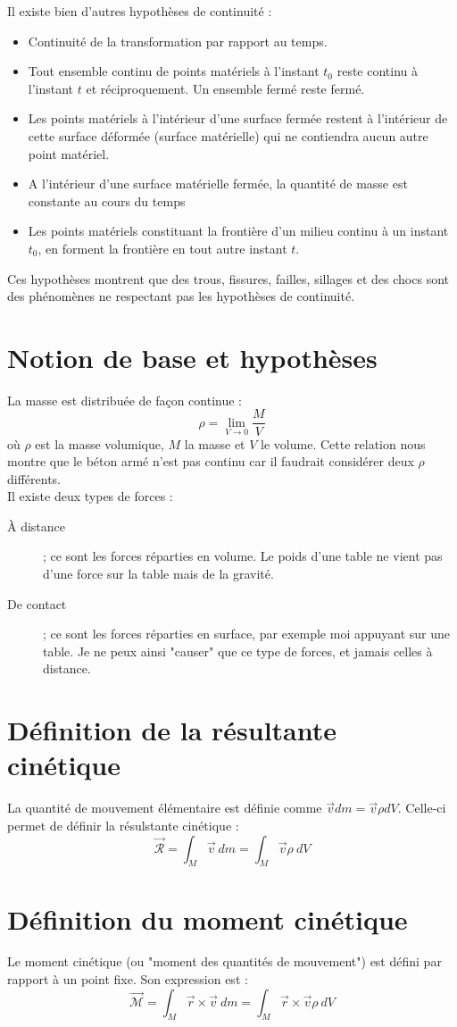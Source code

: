 Il existe bien d'autres hypothèses de continuité :
\begin{itemize}
	\item Continuité de la transformation par rapport au temps.
	\item Tout ensemble continu de points matériels à l'instant $t_0$ reste continu à l'instant $t$
	      et réciproquement. Un ensemble fermé reste fermé.
	\item Les points matériels à l'intérieur d'une surface fermée restent à l'intérieur de cette
	      surface déformée (surface matérielle) qui ne contiendra aucun autre point matériel.
	\item A l'intérieur d'une surface matérielle fermée, la quantité de masse est constante au cours
	      du temps
	\item Les points matériels constituant la frontière d'un milieu continu à un instant $t_0$, en 
	      forment la frontière en tout autre instant $t$.
\end{itemize}
    
Ces hypothèses montrent que des trous, fissures, failles, sillages et des chocs sont des phénomènes
ne respectant pas les hypothèses de continuité.
    
\section*{Notion de base et hypothèses}
La masse est distribuée de façon continue : 
\begin{equation}
	\rho = \lim\limits_{V \rightarrow 0} \frac{M}{V}
\end{equation}
où $\rho$ est la masse volumique, $M$ la masse et $V$ le volume. Cette relation nous montre que
le béton armé n'est pas continu car il faudrait considérer deux $\rho$ différents.\\
    
Il existe deux types de forces :
\begin{description}
	\item[À distance]; ce sont les forces réparties en volume. Le poids d'une table ne vient pas d'une
	force sur la table mais de la gravité.
	\item[De contact]; ce sont les forces réparties en surface, par exemple moi appuyant sur une
	table. Je ne peux ainsi "causer" que ce type de forces, et jamais celles à distance.
\end{description}
     
\section*{Définition de la résultante cinétique}
La quantité de mouvement élémentaire est définie comme $\vec v dm = \vec{v}\rho dV$. Celle-ci 
permet de définir la résulstante cinétique :
\begin{equation}
	\vec{\mathcal{R}} = \int_M \vec{v}\ dm = \int_M \vec{v}\rho\ dV
\end{equation}
    
\section*{Définition du moment cinétique}
Le moment cinétique (ou "moment des quantités de mouvement") est défini par rapport à un point 
fixe. Son expression est :
\begin{equation}
	\vec{\mathcal{M}} = \int_M \vec{r}\times\vec{v}\ dm = \int_M \vec{r}\times\vec{v}\rho\ dV 
\end{equation}